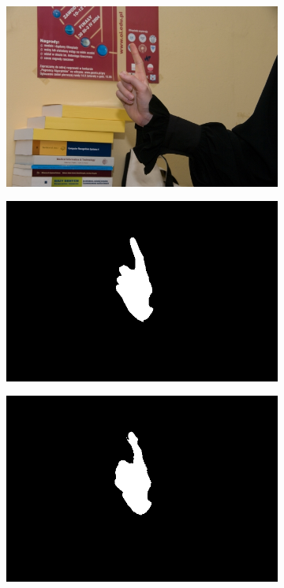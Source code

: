 \begin{figure}[h]
\begin{subfigure}[b]{0.18\textwidth}
         \includegraphics[width=\textwidth]{images/results/base/1_A_hgr2A2_id01_1_x.jpg}
     \end{subfigure}
     \hfill
     \begin{subfigure}[b]{0.18\textwidth}
         \centering
         \includegraphics[width=\textwidth]{images/results/base/1_A_hgr2A2_id01_1_y.png}
     \end{subfigure}
    \hfill
     \begin{subfigure}[b]{0.18\textwidth}
         \centering
         \includegraphics[width=\textwidth]{images/results/base/1_A_hgr2A2_id01_1_skinny_8.png}

\end{subfigure}
\end{figure}

